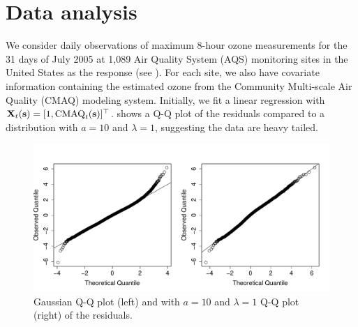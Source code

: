 \section{Data analysis}\label{sts:analysis}
We consider daily observations of maximum 8-hour ozone measurements for the 31 days of July 2005 at 1,089 Air Quality System (AQS) monitoring sites in the United States as the response (see ).
For each site, we also have covariate information containing the estimated ozone from the Community Multi-scale Air Quality (CMAQ) modeling system.
Initially, we fit a linear regression with $\mathbf{X}_t(\mathbf{s}) = [1, \text{CMAQ}_t(\mathbf{s})]^\top$. %
 shows a Q-Q plot of the residuals compared to a \skewt distribution with $a = 10$ and $\lambda = 1$, suggesting the data are heavy tailed.
\begin{figure}
  \centering
  \includegraphics[width=\linewidth]{plots/qq-res.pdf}
  \caption{Gaussian Q-Q plot (left) and \skewt with $a = 10$ and $\lambda = 1$ Q-Q plot (right) of the residuals.}
  \label{stfig:ozone-qq}
\end{figure}

